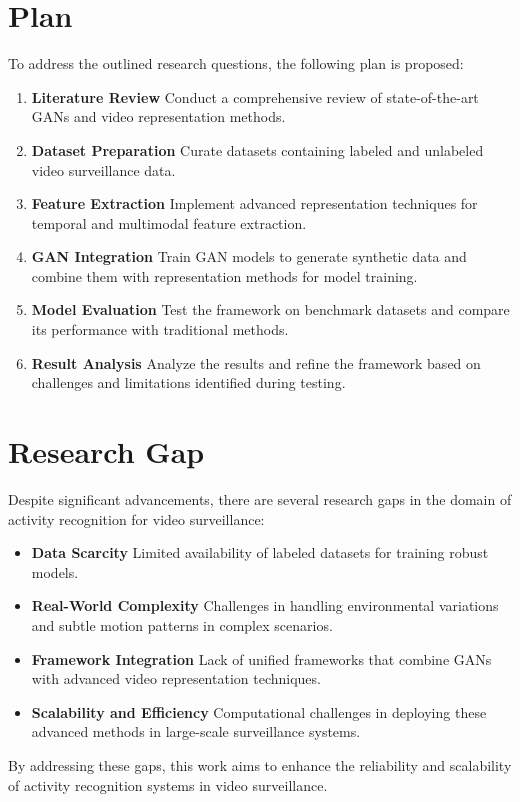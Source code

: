\documentclass{article}
\begin{document}
\section*{Plan}
To address the outlined research questions, the following plan is proposed:
\begin{enumerate}
    \item \textbf{Literature Review} Conduct a comprehensive review of state-of-the-art GANs and video representation methods.
    \item \textbf{Dataset Preparation} Curate datasets containing labeled and unlabeled video surveillance data.
    \item \textbf{Feature Extraction} Implement advanced representation techniques for temporal and multimodal feature extraction.
    \item \textbf{GAN Integration} Train GAN models to generate synthetic data and combine them with representation methods for model training.
    \item \textbf{Model Evaluation} Test the framework on benchmark datasets and compare its performance with traditional methods.
    \item \textbf{Result Analysis} Analyze the results and refine the framework based on challenges and limitations identified during testing.
\end{enumerate}

\section*{Research Gap}
Despite significant advancements, there are several research gaps in the domain of activity recognition for video surveillance:
\begin{itemize}
    \item \textbf{Data Scarcity} Limited availability of labeled datasets for training robust models.
    \item \textbf{Real-World Complexity} Challenges in handling environmental variations and subtle motion patterns in complex scenarios.
    \item \textbf{Framework Integration} Lack of unified frameworks that combine GANs with advanced video representation techniques.
    \item \textbf{Scalability and Efficiency} Computational challenges in deploying these advanced methods in large-scale surveillance systems.
\end{itemize}
By addressing these gaps, this work aims to enhance the reliability and scalability of activity recognition systems in video surveillance.
\end{document}
